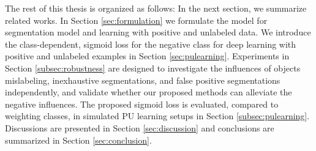 
The rest of this thesis is organized as follows:
In the next section, we summarize related works.
In Section \ref{sec:formulation} we formulate the model for segmentation model and learning with positive and unlabeled data.
We introduce the class-dependent, sigmoid loss for the negative class for deep learning with positive and unlabeled examples in Section \ref{sec:pulearning}.
Experiments in Section \ref{subsec:robustness} are designed to investigate the influences of objects mislabeling, inexhaustive segmentations, and false positive segmentations independently, and validate whether our proposed methods can alleviate the negative influences.
The proposed sigmoid loss is evaluated, compared to weighting classes, in simulated PU learning setups in Section \ref{subsec:pulearning}.
Discussions are presented in Section \ref{sec:discussion} and conclusions are summarized in Section \ref{sec:conclusion}.
